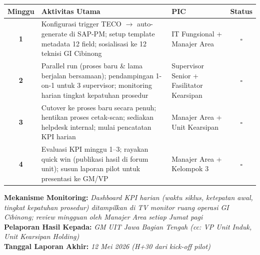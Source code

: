 \documentclass[12pt,a4paper]{report}
\begin{document}
\begin{tcolorbox}[colback=plnorange!5, colframe=plnorange, sharp corners, title={\bfseries Action Plan 30 Hari}]
\small
\renewcommand{\arraystretch}{1.5}
\begin{tabularx}{\textwidth}{@{} c >{\raggedright\arraybackslash}X >{\raggedright\arraybackslash}X c @{}}
\toprule
\textbf{Minggu} & \textbf{Aktivitas Utama} & \textbf{PIC} & \textbf{Status} \\
\midrule
\textbf{1} & Konfigurasi trigger TECO $\rightarrow$ auto-generate di SAP-PM; setup template metadata 12 field; sosialisasi ke 12 teknisi GI Cibinong & IT Fungsional + Manajer Area & $\square$ \\
\hline
\textbf{2} & Parallel run (proses baru \& lama berjalan bersamaan); pendampingan 1-on-1 untuk 3 supervisor; monitoring harian tingkat kepatuhan prosedur & Supervisor Senior + Fasilitator Kearsipan & $\square$ \\
\hline
\textbf{3} & Cutover ke proses baru secara penuh; hentikan proses cetak-scan; sediakan helpdesk internal; mulai pencatatan KPI harian & Manajer Area + Unit Kearsipan & $\square$ \\
\hline
\textbf{4} & Evaluasi KPI minggu 1--3; rayakan quick win (publikasi hasil di forum unit); susun laporan pilot untuk presentasi ke GM/VP & Manajer Area + Kelompok 3 & $\square$ \\
\bottomrule
\end{tabularx}
\renewcommand{\arraystretch}{1.0}

\vspace{0.3cm}
\noindent\textbf{Mekanisme Monitoring:} \textit{Dashboard KPI harian (waktu siklus, ketepatan awal, tingkat kepatuhan prosedur) ditampilkan di TV monitor ruang operasi GI Cibinong; review mingguan oleh Manajer Area setiap Jumat pagi}\\[0.2cm]
\noindent\textbf{Pelaporan Hasil Kepada:} \textit{GM UIT Jawa Bagian Tengah (cc: VP Unit Induk, Unit Kearsipan Holding)}\\[0.2cm]
\noindent\textbf{Tanggal Laporan Akhir:} \textit{12 Mei 2026 (H+30 dari kick-off pilot)}

\end{tcolorbox}

\vspace{0.5cm}
\end{document}
